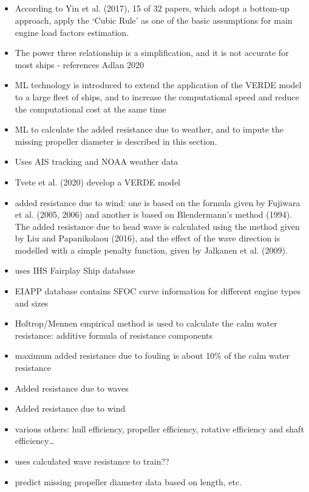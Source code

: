 \documentclass{article}
\newcommand{\paperpath}{../resources/}
\newcommand{\myhref}[2]{\href{run:\paperpath#1}{#2}}
\begin{document}
\subsection{\myhref{Guo et al 2022 - Combined machine learning and physics-based models for estimating fuel.pdf}{\textcite{guo2022combined}}}
\begin{itemize}
    \item According to Yin et al. (2017), 15 of 32 papers, which adopt a bottom-up approach, apply the ‘Cubic Rule’ as one of the basic as­sumptions for main engine load factors estimation.
    \item The power three relationship is a simplification, and it is not accurate for most ships - references Adlan 2020
    \item ML technology is introduced to extend the application of the VERDE model to a large fleet of ships, and to increase the computational speed and reduce the computational cost at the same time
    \item ML to calculate the added resistance due to weather, and to impute the missing propeller     diameter is described in this section.
    \item Uses AIS tracking and NOAA weather data
    \item Tvete et al. (2020) develop a VERDE model
    \item added resistance due to wind: one is based on the formula given by Fujiwara et al. (2005, 2006) and another is based on Blendermann’s method (1994). The added resistance due to head wave is calculated using the method given by Liu and Papanikolaou (2016), and the effect of the wave direction is modelled with a simple penalty function, given by Jalkanen et al. (2009).
    \item uses IHS Fairplay Ship database
    \item EIAPP database contains SFOC curve information for different engine types and sizes
    \item Holtrop/Mennen empirical method is used to calculate the calm water resistance: additive formula of resistance components
    \item maximum added resistance due to fouling is about 10\% of the calm water resistance
    \item Added resistance due to waves
    \item Added resistance due to wind
    \item various others: hull efficiency, propeller efficiency, rotative efficiency and shaft efficiency\dots
    \item uses calculated wave resistance to train??
    \item predict missing propeller diameter data based on length, etc.
\end{itemize}
\end{document}
